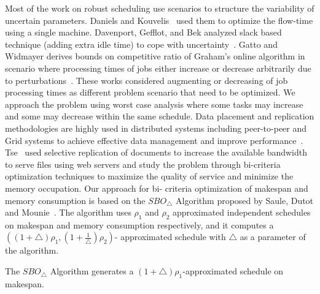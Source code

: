  Most of the work on robust scheduling use scenarios to structure
 the variability of uncertain parameters. Daniels and
 Kouvelis~\cite{citeulike:8334169} used them to optimize the flow-time
 using a single machine. Davenport, Gefflot, and Bek analyzed slack
 based technique (adding extra idle time) to cope with
 uncertainty~\cite{Davenport_slack-basedtechniques}. Gatto and Widmayer
 derives bounds on competitive ratio of Graham’s online algorithm in
 scenario where processing times of jobs either increase or decrease
 arbitrarily due to perturbations~\cite{Gatto07}.  These works
 considered augmenting or decreasing of job processing times as
 different problem scenario that need to be optimized. We 
 approach the problem using worst case analysis where some tasks may
 increase and some may decrease within the same schedule.
 Data placement and replication methodologies are highly used in
 distributed systems including peer-to-peer and Grid systems to achieve
 effective data management and improve
 performance~\cite{Cirne2007213}\cite{Abawajy}\cite{4215379}. Tse~\cite{DBLP:journals/tc/Tse12}
 used selective replication of documents to increase the available
 bandwidth to serve files using web servers and study the problem
 through bi-criteria optimization techniques to maximize the quality of
 service and minimize the memory occupation. Our approach for bi- criteria optimization of makespan and memory consumption is based on the $ SBO_{\triangle}$ Algorithm proposed by Saule, Dutot and Mounie~\cite{10.1109/IPDPS.2008.4536292}. The algorithm uses  $\rho_1$ and $\rho_2$ approximated independent schedules on makespan and memory consumption respectively, and it computes a $((1+\triangle)\rho_1 , (1+\frac{1}{\triangle})\rho_2 )$- approximated schedule with $\triangle$ as a parameter of the algorithm.
 \begin{property}\cite{10.1109/IPDPS.2008.4536292}
 The $SBO_\triangle$ Algorithm generates a $ (1+\triangle)  \rho_1$-approximated schedule on makespan.
 \end{property}         
